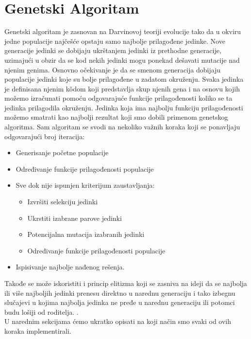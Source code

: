 \documentclass[a4paper]{article}
\begin{document}
\section{Genetski Algoritam}
Genetski algoritam je zasnovan na Darvinovoj teoriji evolucije tako da u okviru jedne populacije najčešće opstaju samo najbolje prilagođene jedinke. Nove generacije jedinki se dobijaju ukrštanjem jedinki iz prethodne generacije, uzimajući u obzir da se kod nekih jedinki mogu ponekad dešavati mutacije nad njenim genima. Osnovno očekivanje je da se smenom generacija dobijaju populacije jedinki koje su bolje prilagođene u zadatom okruženju. Svaka jedinka je definisana njenim kôdom koji predstavlja skup njenih gena i na osnovu kojih možemo izračunati pomoću odgovarajuće funkcije prilagođenosti koliko se ta jedinka prilagodila okruženju. Jedinka koja ima najbolju funkciju prilagođenosti možemo smatrati kao najbolji rezultat koji smo dobili primenom genetskog algoritma. Sam algoritam se svodi na nekoliko važnih koraka koji se ponavljaju odgovarajući broj iteracija:
\begin{itemize}
  \item Generisanje početne populacije
  \item Određivanje funkcije prilagođenosti populacije
  \item Sve dok nije ispunjen kriterijum zaustavljanja:
  \begin{itemize}
	\item Izvršiti selekciju jedinki
	\item Ukrstiti izabrane parove jedinki
	\item Potencijalna mutacija izabranih jedinki
	\item Određivanje funkcije prilagođenosti populacije
  \end{itemize}
  \item Ispisivanje najbolje nađenog rešenja.
\end{itemize}

Takođe se može iskoristiti i princip elitizma koji se zasniva na ideji da  se najbolja ili više najboljih jedinki prenesu direktno u narednu generaciju i tako izbegnu slučajevi u kojima najbolja jedinka ne pređe u narednu generaciju ili potomci budu lošiji od roditelja. \cite{genetskiAlgoritamAlicicMatf}. \\


U narednim sekcijama ćemo ukratko opisati na koji način smo svaki od ovih koraka implementirali.
\end{document}
